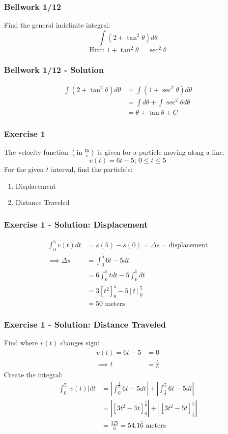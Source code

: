 \documentclass[12pt]{beamer}
\begin{document}
\begin{frame}
	\frametitle{Bellwork 1/12}
	\initclock

	\vfill
	\vfill
	\vfill
	\Large
	Find the general indefinite integral:
	\vfill
	\[\int (2+\tan^2\theta)d\theta\]
	\vfill
	\large
	\[\text{Hint: }1+\tan^2\theta=\sec^2\theta\]
	\vfill
	\vfill
	\vfill
	\vfill

	\small
	\crono
\end{frame}
\begin{frame}
	\frametitle{Bellwork 1/12 - Solution}

	\Large
	\begin{align*}
		\int (2+\tan^2\theta)d\theta&=\int (1 + \sec^2\theta)d\theta \\
		&=\int d\theta + \int \sec^2\theta d\theta\\
		&=\boxed{\theta + \tan\theta + C}
	\end{align*}
\end{frame}
\begin{frame}
	\frametitle{Exercise 1}

	\large
	The velocity function $\left(\text{in }\frac{\text{m}}{\text{s}}\right)$ is given for a particle moving along a line. \\
	\[v(t)=6t-5\text{; }0\leq t\leq 5\]
	\vfill
	For the given $t$ interval, find the particle's:
	\begin{enumerate}
		\item Displacement
		\item Distance Traveled
	\end{enumerate}
\end{frame}
\begin{frame}
	\frametitle{Exercise 1 - Solution: Displacement}

	\large
	\begin{align*}
		\int_{0}^{5}v(t)dt &= s(5)-s(0)=\Delta s=\text{displacement}\\
		\implies \Delta s &= \int_{0}^{5}6t-5dt\\
		&= 6\int_{0}^{5}tdt-5\int_{0}^{5}dt\\
		&= 3[t^2]_0^5-5[t]_0^5\\
		&= \boxed{50\text{ meters}}
	\end{align*}
\end{frame}
\begin{frame}
	\frametitle{Exercise 1 - Solution: Distance Traveled}

	Find where $v(t)$ changes sign:
	\begin{align*}
		v(t)=6t-5&=0\\
		\implies t&=\frac{5}{6}
	\end{align*}
	Create the integral:
	\begin{align*}
		\int_{0}^{5}|v(t)|dt&=\left|\int_{0}^{\frac{5}{6}}6t-5dt\right|+\left|\int_{\frac{5}{6}}^{5}6t-5dt\right|\\
		&= \left|[3t^2-5t]_0^\frac{5}{6}\right|+\left|[3t^2-5t]_\frac{5}{6}^5\right|\\
		&= \boxed{\frac{325}{6}=54.1\overline{6}\text{ meters}}
	\end{align*}
\end{frame}
\end{document}
